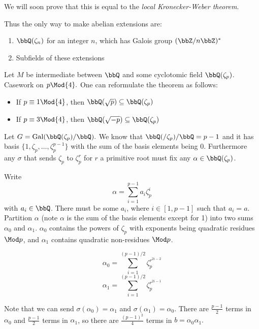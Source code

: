 \documentclass[a4paper, 12pt,oneside,openany]{book}
\begin{document}
We will soon prove that this is equal to the \emph{local Kronecker-Weber theorem}.


Thus the only way to make abelian extensions are:

\begin{enumerate}
	\item $\bbQ(\zeta_n)$ for an integer $n$, which has Galois group $(\bbZ/n\bbZ)^*$
	\item Subfields of these extensions
\end{enumerate}


 Let $M$ be intermediate between $\bbQ$ and some cyclotomic field $\bbQ(\zeta_p)$. Casework on $p \Mod{4}.$ One can reformulate the theorem as follows:
	
\begin{itemize}
	\item If $p \equiv 1 \Mod{4}$, then $\bbQ(\sqrt{p}) \subseteq \bbQ(\zeta_p)$
	\item If $p \equiv 3 \Mod{4}$, then $\bbQ(\sqrt{-p}) \subseteq \bbQ(\zeta_p)$
\end{itemize}


Let $G = \text{Gal}(\bbQ(\zeta_p)/\bbQ).$ We know that $\bbQ(/\zeta_p)/\bbQ= p-1$ and it has basis $\{1, \zeta_p, \dots, \zeta_p^{p-1}\}$ with the sum of the basis elements being $0$. Furthermore any $\sigma$ that sends $\zeta_p$ to $\zeta_p^r$ for $r$ a primitive root must fix any $\alpha \in \bbQ(\zeta_p)$.

Write $$\alpha = \sum\limits_{i=1}^{p-1} a_i \zeta_p^i$$ with $a_i \in \bbQ$. There must be some $a_i$, where $i \in [1, p-1]$ such that $a_i=a.$ Partition $\alpha$ (note $\alpha$ is the sum of the basis elements except for 1) into two sums $\alpha_0$ and $\alpha_1$. $\alpha_0$ contains the powers of $\zeta_p$ with exponents being quadratic residues $\Mod p$, and $\alpha_1$ contains quadratic non-residues $\Mod p$.

$$\alpha_0 = \sum\limits_{i=1}^{(p-1)/2} \zeta_p^{r^{2i-2}}$$
$$\alpha_1 = \sum\limits_{i=1}^{(p-1)/2} \zeta_p^{r^{2i-1}}$$

Note that we can send $\sigma(\alpha_0)=\alpha_1$ and $\sigma(\alpha_1)=\alpha_0$. There are $\frac{p-1}{2}$ terms in $\alpha_0$ and $\frac{p-1}{2}$ terms in $\alpha_1$, so there are $\frac{(p-1)^2}{4}$ terms in $b=\alpha_0\alpha_1.$ 
\end{document}

